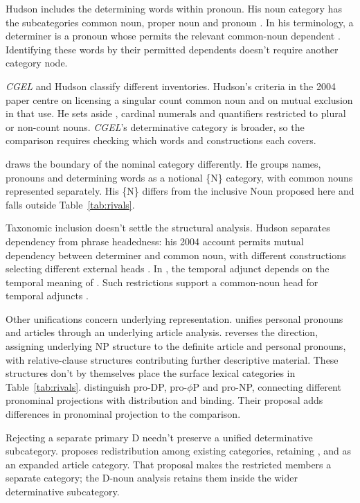\documentclass[12pt]{article}
\begin{document}
Hudson includes the determining words within pronoun. His noun category has the subcategories common noun, proper noun and pronoun \citep[253--254]{hudson2010wordgrammar}. In his terminology, a determiner is a pronoun whose  permits the relevant common-noun dependent \citep[9--10]{hudson2004determiners}. Identifying these words by their permitted dependents doesn't require another category node.

\textit{CGEL} and Hudson classify different inventories. Hudson's criteria in the 2004 paper centre on licensing a singular count common noun and on mutual exclusion in that use. He sets aside , cardinal numerals and quantifiers restricted to plural or non-count nouns. \textit{CGEL}'s determinative category is broader, so the comparison requires checking which words and constructions each covers.

\textcite{anderson1997notional} draws the boundary of the nominal category differently. He groups names, pronouns and determining words as a notional \{N\} category, with common nouns represented separately. His \{N\} differs from the inclusive Noun proposed here and falls outside Table~\ref{tab:rivals}.

Taxonomic inclusion doesn't settle the structural analysis. Hudson separates dependency from phrase headedness: his 2004 account permits mutual dependency between determiner and common noun, with different constructions selecting different external heads \citep[7--9]{hudson2004determiners}. In , the temporal adjunct depends on the temporal meaning of . Such restrictions support a common-noun head for temporal adjuncts \citep[10--12]{hudson2004determiners}.

Other unifications concern underlying representation. \textcite{postal1966} unifies personal pronouns and articles through an underlying article analysis. \textcite[197--203]{sommerstein1972} reverses the direction, assigning underlying NP structure to the definite article and personal pronouns, with relative-clause structures contributing further descriptive material. These structures don't by themselves place the surface lexical categories in Table~\ref{tab:rivals}. \textcite{dechainewiltschko2002} distinguish pro-DP, pro-$\phi$P and pro-NP, connecting different pronominal projections with distribution and binding. Their proposal adds differences in pronominal projection to the comparison.

Rejecting a separate primary D needn't preserve a unified determinative subcategory. \textcite{spinillo2004reconceptualising} proposes redistribution among existing categories, retaining ,  and  as an expanded article category. That proposal makes the restricted members a separate category; the D-noun analysis retains them inside the wider determinative subcategory.
\end{document}
